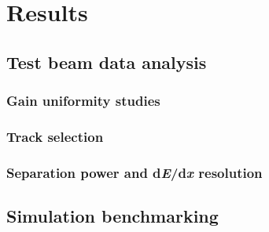 \chapter{Results}
\section{Test beam data analysis}
\subsection{Gain uniformity studies}
\subsection{Track selection}
\subsection{Separation power and d\textit{E}/d\textit{x} resolution}
\section{Simulation benchmarking}